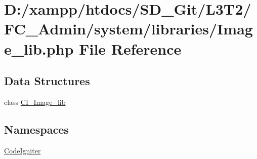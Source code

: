 \hypertarget{_admin_2system_2libraries_2_image__lib_8php}{}\section{D\+:/xampp/htdocs/\+S\+D\+\_\+\+Git/\+L3\+T2/\+F\+C\+\_\+\+Admin/system/libraries/\+Image\+\_\+lib.php File Reference}
\label{_admin_2system_2libraries_2_image__lib_8php}
\subsection*{Data Structures}
\begin{DoxyCompactItemize}
\item 
class \hyperlink{class_c_i___image__lib}{C\+I\+\_\+\+Image\+\_\+lib}
\end{DoxyCompactItemize}
\subsection*{Namespaces}
\begin{DoxyCompactItemize}
\item 
 \hyperlink{namespace_code_igniter}{Code\+Igniter}
\end{DoxyCompactItemize}

